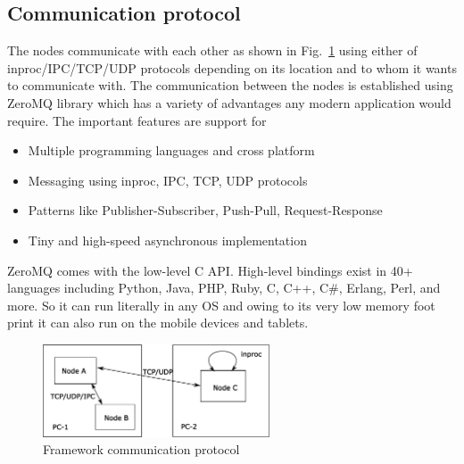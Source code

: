 \subsection{Communication protocol}	
The nodes communicate with each other as shown in Fig.~\ref{fig:framework} using either of inproc/IPC/TCP/UDP protocols depending on its location and to whom it wants to communicate with. The communication between the nodes is established using ZeroMQ \cite{ZeroMQ} library which has a variety of advantages any modern application would require. The important features are support for
\begin{itemize}[leftmargin={1cm},topsep={0pt},itemsep={0pt},partopsep={0pt},parsep={0pt}] 
\item Multiple programming languages and cross platform
\item Messaging using inproc, IPC, TCP, UDP protocols
\item Patterns like Publisher-Subscriber, Push-Pull, Request-Response
\item Tiny and high-speed asynchronous implementation
\end{itemize}
ZeroMQ comes with the low-level C API. High-level bindings exist in 40+ languages including Python, Java, PHP, Ruby, C, C++, C\#, Erlang, Perl, and more. So it can run literally in any OS and owing to its very low memory foot print it can also run on the mobile devices and tablets.
\begin{figure}[H]
\centering
\includegraphics[width=0.6\textwidth]{assets/architecture_comm.eps}
\caption[Framework communication protocol]{Framework communication protocol}
\label{fig:framework}
\end{figure}
